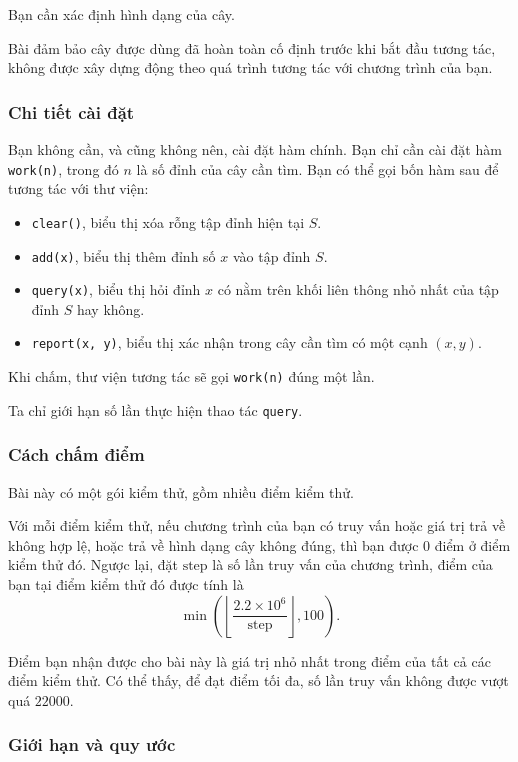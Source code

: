 \documentclass[11pt]{article}
\begin{document}
Bạn cần xác định hình dạng của cây.

Bài đảm bảo cây được dùng đã hoàn toàn cố định trước khi bắt đầu tương tác,
không được xây dựng động theo quá trình tương tác với chương trình của bạn.

\subsubsection{Chi tiết cài đặt}

Bạn không cần, và cũng không nên, cài đặt hàm chính. Bạn chỉ cần cài đặt hàm
\texttt{work(n)}, trong đó \(n\) là số đỉnh của cây cần tìm. Bạn có thể gọi bốn
hàm sau để tương tác với thư viện:

\begin{itemize}
  \item \texttt{clear()}, biểu thị xóa rỗng tập đỉnh hiện tại \(S\).
  \item \texttt{add(x)}, biểu thị thêm đỉnh số \(x\) vào tập đỉnh \(S\).
  \item \texttt{query(x)}, biểu thị hỏi đỉnh \(x\) có nằm trên khối liên thông
  nhỏ nhất của tập đỉnh \(S\) hay không.
  \item \texttt{report(x, y)}, biểu thị xác nhận trong cây cần tìm có một cạnh
  \((x,y)\).
\end{itemize}

Khi chấm, thư viện tương tác sẽ gọi \texttt{work(n)} đúng một lần.

Ta chỉ giới hạn số lần thực hiện thao tác \texttt{query}.

\subsubsection{Cách chấm điểm}

Bài này có một gói kiểm thử, gồm nhiều điểm kiểm thử.

Với mỗi điểm kiểm thử, nếu chương trình của bạn có truy vấn hoặc giá trị trả về
không hợp lệ, hoặc trả về hình dạng cây không đúng, thì bạn được \(0\) điểm ở
điểm kiểm thử đó. Ngược lại, đặt \(\mathrm{step}\) là số lần truy vấn của chương
trình, điểm của bạn tại điểm kiểm thử đó được tính là
\[
  \min\left(\left\lfloor\frac{2.2\times 10^6}{\mathrm{step}}\right\rfloor,100\right).
\]

Điểm bạn nhận được cho bài này là giá trị nhỏ nhất trong điểm của tất cả các
điểm kiểm thử. Có thể thấy, để đạt điểm tối đa, số lần truy vấn không được vượt
quá \(22000\).

\subsubsection{Giới hạn và quy ước}
\end{document}
